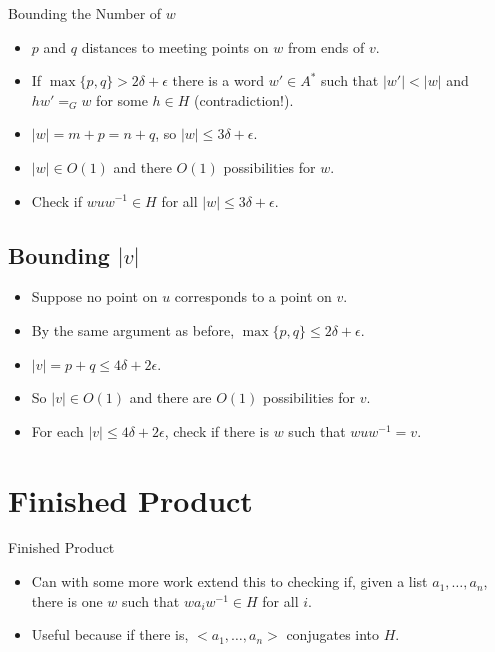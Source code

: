 \documentclass{article}
\begin{document}
\begin{frame}{Bounding the Number of $w$}
  \begin{itemize}
	\item $p$ and $q$ distances to meeting points on $w$ from ends of $v$.
	\only<1-2,4->{
	\begin{figure}
	
	\end{figure}
	}
	\only<3>{
	\begin{figure}
	
	\end{figure}
	}
	\pause
	\item If $\max\{p,q\} > 2\delta + \epsilon$ there is a word $w' \in A^*$ such that $|w'| < |w|$ and $hw' =_G w$ for some $h \in H$ (contradiction!).
	\pause
	\pause
	\item $|w| = m + p = n + q$, so $|w| \le 3\delta + \epsilon$.
	\pause
	\item $|w| \in O(1)$ and there $O(1)$ possibilities for $w$.
	\pause
	\item Check if $wuw^{-1} \in H$ for all $|w| \le 3\delta + \epsilon$.
  \end{itemize}
\end{frame}

\subsection{Bounding $|v|$}

\begin{frame}
  \begin{itemize}
    \item Suppose no point on $u$ corresponds to a point on $v$.
	\pause
	\begin{figure}
	
	\end{figure}
	\pause
	\item By the same argument as before, $\max\{p,q\} \le 2\delta + \epsilon$.
	\pause
	\item $|v| = p + q \le 4\delta + 2\epsilon$.
	\pause
	\item So $|v| \in O(1)$ and there are $O(1)$ possibilities for $v$.
	\pause
	\item For each $|v| \le 4\delta + 2\epsilon$, check if there is $w$ such that $wuw^{-1} = v$.
  \end{itemize}
\end{frame}

\section{Finished Product}

\begin{frame}{Finished Product}
  \begin{itemize}
    \item Can with some more work extend this to checking if, given a list $a_1, \ldots, a_n$, there is one $w$ such that $wa_iw^{-1} \in H$ for all $i$.
	\pause
    \item Useful because if there is, $<\!\!a_1, \ldots, a_n\!\!>$ conjugates into $H$.
  \end{itemize}
  \pause
\end{frame}
  
\end{document}
